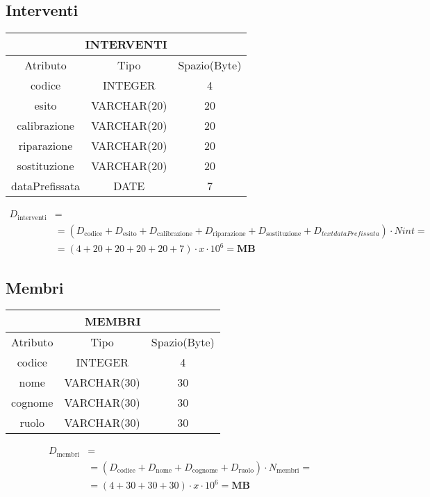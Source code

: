 \subsection{Interventi}
\begin{tabular}{ |c|c|c|}
  \hline
  \multicolumn{3}{|c|}{\textbf{INTERVENTI}} \\
  \hline
  Atributo & Tipo & Spazio(Byte) \\
  \hline
  codice & INTEGER & 4 \\
  esito & VARCHAR(20) & 20 \\
  calibrazione & VARCHAR(20) & 20 \\
  riparazione & VARCHAR(20) & 20 \\
  sostituzione & VARCHAR(20) & 20 \\
  dataPrefissata & DATE & 7 \\
  \hline
\end{tabular}
\begin{equation}
  \begin{aligned}
    D_{\text{interventi}} &=\\
    &=(D_{\text{codice}} + D_{\text{esito}} +D_{\text{calibrazione}} +D_{\text{riparazione}} + D_{\text{sostituzione}} + D_{text{dataPrefissata}}) \cdot  Nint =\\
    &=(4+20+20+20+20+7)\cdot x\cdot 10^6= \textbf{MB}
  \end{aligned}
\end{equation}
\subsection{Membri}
\begin{tabular}{ |c|c|c|}
  \hline
  \multicolumn{3}{|c|}{\textbf{MEMBRI}}\\
  \hline
  Atributo & Tipo & Spazio(Byte) \\
  \hline
  codice & INTEGER & 4 \\
  nome & VARCHAR(30) & 30 \\
  cognome & VARCHAR(30) & 30 \\
  ruolo & VARCHAR(30) & 30\\
  \hline
\end{tabular}
\begin{equation}
  \begin{aligned}
    D_{\text{membri}} &=\\
    &=(D_{\text{codice}} + D_{\text{nome}} +D_{\text{cognome}} +D_{\text{ruolo}}) \cdot  N_{\text{membri}} =\\
    &=(4+30+30+30) \cdot x\cdot 10^6= \textbf{MB}
  \end{aligned}
\end{equation}
